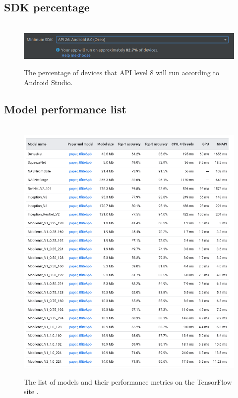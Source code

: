 \documentclass[12pt,a4paper]{report}
\begin{document}
\subsection{SDK percentage}

\label{subsec:sdk}

\begin{figure}[h]\
    \centering
    \includegraphics[width=\textwidth]{Min_SDK.png}
    \caption{The percentage of devices that API level 8 will run according to Android Studio.}
    \label{fig:sdk}
\end{figure}

\clearpage

\subsection{Model performance list}

\label{subsec:models}

\begin{figure}[h]\
    \centering
    \includegraphics[width=\textwidth]{models.png}
    \caption{The list of models and their performance metrics on the TensorFlow site \citep{TFhostedmodels}.}
    \label{fig:models}
\end{figure}
\clearpage
\end{document}
